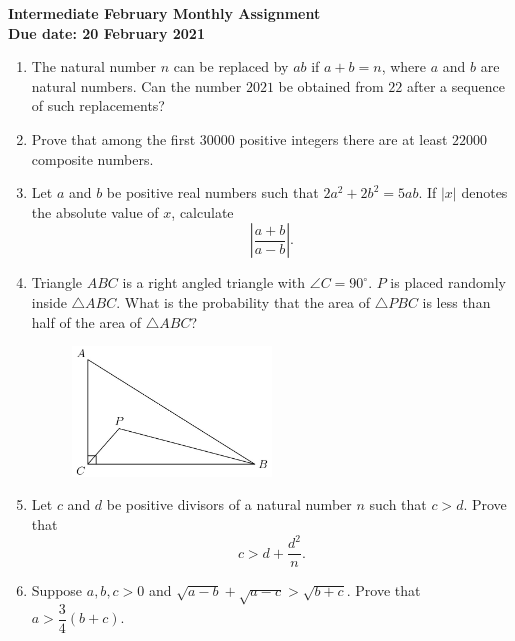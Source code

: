 \documentclass{article}
\begin{document}
\thispagestyle{empty}

\begin{center}
  \textbf{\Large Intermediate February Monthly Assignment}
  \\ \vspace{1em}
  \textbf{\large Due date: 20 February 2021}
\end{center}

\vspace{12pt}

\begin{enumerate}[1.]

\vspace{6pt}
\item %
The natural number $n$ can be replaced by $ab$ if $a + b = n$, where $a$ and $b$ are natural numbers. Can the number $2021$ be obtained from $22$ after a sequence of such
replacements?


\vspace{6pt}
\item %
Prove that among the first $30000$ positive integers there are at least $22000$ composite numbers.


\vspace{6pt}
\item %
Let $a$ and $b$ be positive real numbers such that $2a^2 +2b^2 = 5ab$.
If $|x|$ denotes the absolute value of $x$, calculate
\[ \left|\frac{a+b}{a-b}\right|. \]


\vspace{6pt}
\item %
Triangle $ABC$ is a right angled triangle with $\angle C = 90^{\circ}$. $P$ is placed randomly inside $\triangle ABC$. What is the probability that the area of $\triangle PBC$ is less than half of the area of $\triangle ABC$?
\begin{figure}[h]
\centering
\includegraphics[width=0.5\textwidth]{fig.jpg}
\end{figure}


\vspace{6pt}
\item %
Let $c$ and $d$ be positive divisors of a natural number $n$ such that $c > d$. Prove that $$c > d + \frac{d^2}{n}.$$


\vspace{6pt}
\item %
Suppose $a,b,c > 0$ and $\sqrt{a-b} +\sqrt{a-c} > \sqrt{b+c}$. Prove that $a > \dfrac{3}{4} (b+c)$.


\end{enumerate}
\end{document}
